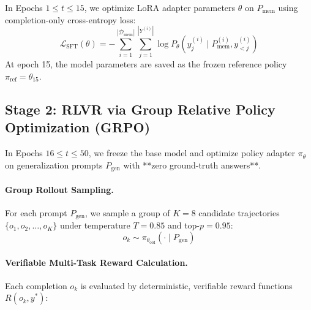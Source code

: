 \documentclass[11pt]{article}
\newcommand{\Lsft}{\mathcal{L}_{\text{SFT}}}
\newcommand{\Pmem}{P_{\text{mem}}}
\newcommand{\Pgen}{P_{\text{gen}}}
\theoremstyle{definition}
\begin{document}
In Epochs $1 \le t \le 15$, we optimize LoRA adapter parameters $\theta$ on $\Pmem$ using completion-only cross-entropy loss:
\begin{equation}
  \Lsft(\theta) = - \sum_{i=1}^{|\mathcal{D}_{\text{mem}}|} \sum_{j=1}^{|Y^{(i)}|} \log P_\theta(y_j^{(i)} \mid \Pmem^{(i)}, y_{<j}^{(i)})
\end{equation}
At epoch 15, the model parameters are saved as the frozen reference policy $\pi_{\text{ref}} = \theta_{15}$.

\subsection{Stage 2: RLVR via Group Relative Policy Optimization (GRPO)}

In Epochs $16 \le t \le 50$, we freeze the base model and optimize policy adapter $\pi_\theta$ on generalization prompts $\Pgen$ with **zero ground-truth answers**.

\paragraph{Group Rollout Sampling.} For each prompt $\Pgen$, we sample a group of $K=8$ candidate trajectories $\{o_1, o_2, \dots, o_K\}$ under temperature $T=0.85$ and top-$p=0.95$:
\begin{equation}
  o_k \sim \pi_{\theta_{\text{old}}}(\cdot \mid \Pgen)
\end{equation}

\paragraph{Verifiable Multi-Task Reward Calculation.} Each completion $o_k$ is evaluated by deterministic, verifiable reward functions $R(o_k, y^*)$:
\end{document}

